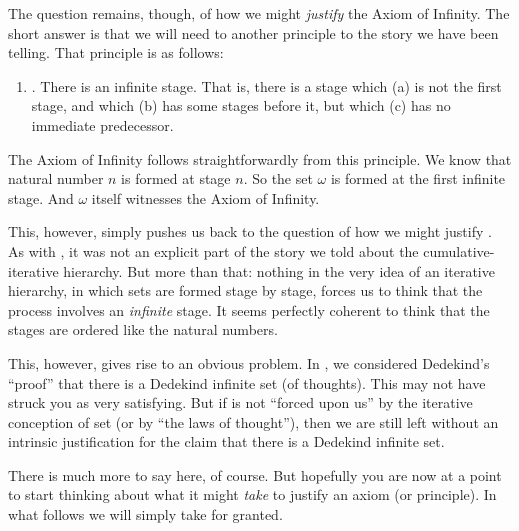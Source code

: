 \documentclass[../../../include/open-logic-section]{subfiles}
\begin{document}
The question remains, though, of how we might \emph{justify} the Axiom
of Infinity. The short answer is that we will need to another
principle to the story we have been telling. That principle is as
follows:
\begin{enumerate}
	\item[] \stagesinf. There is an infinite stage. That is, there is a stage which (a) is not the first stage, and which (b) has some stages before it, but which (c) has no immediate predecessor.
\end{enumerate}
The Axiom of Infinity follows straightforwardly from this principle.
We know that natural number $n$ is formed at stage $n$. So the set
$\omega$ is formed at the first infinite stage. And $\omega$ itself
witnesses the Axiom of Infinity. 

This, however, simply pushes us back to the question of how we might
justify \stagesinf. As with \stagessucc, it was not an explicit part
of the story we told about the cumulative-iterative hierarchy. But
more than that: nothing in the very idea of an iterative hierarchy, in
which sets are formed stage by stage, forces us to think that the
process involves an \emph{infinite} stage. It seems perfectly coherent
to think that the stages are ordered like the natural numbers. 

This, however, gives rise to an obvious problem. In
, we considered
Dedekind's ``proof'' that there is a Dedekind infinite set (of
thoughts). This may not have struck you as very satisfying. But if
\stagesinf{} is not ``forced upon us'' by the iterative conception of
set (or by ``the laws of thought''), then we are still left without an
intrinsic justification for the claim that there is a Dedekind
infinite set.

There is much more to say here, of course. But hopefully you are now
at a point to start thinking about what it might \emph{take} to
justify an axiom (or principle). In what follows we will simply take
\stagesinf{} for granted.
\end{document}
